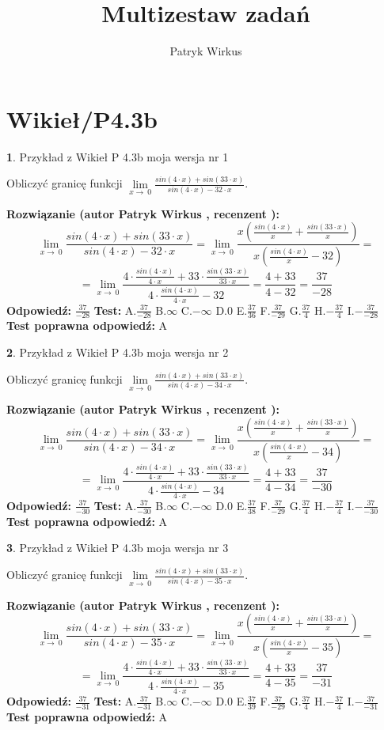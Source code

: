 \documentclass[12pt, a4paper]{article}
\title{Multizestaw zadań}
\author{Patryk Wirkus}
\date{}
\theoremstyle{definition} %
\newtheorem{zad}{}
\newcommand{\kategoria}[1]{\section{#1}}
\newcommand{\zadStart}[1]{\begin{zad}#1\newline}
\newcommand{\zadStop}{\end{zad}}
\newcommand{\rozwStart}[2]{\noindent \textbf{Rozwiązanie (autor #1 , recenzent #2): }\newline}
\newcommand{\rozwStop}{\newline}
\newcommand{\odpStart}{\noindent \textbf{Odpowiedź:}\newline}
\newcommand{\odpStop}{\newline}
\newcommand{\testStart}{\noindent \textbf{Test:}\newline}
\newcommand{\testStop}{\newline}
\newcommand{\kluczStart}{\noindent \textbf{Test poprawna odpowiedź:}\newline}
\newcommand{\kluczStop}{\newline}
\begin{document}
\maketitle

\kategoria{Wikieł/P4.3b}


\zadStart{Przykład z Wikieł P 4.3b moja wersja nr 1}


Obliczyć granicę funkcji $\lim\limits_{x\to\ 0}\frac{sin(4 \cdot x)+sin(33 \cdot x)}{sin(4 \cdot x)-32 \cdot x}$.
\zadStop
\rozwStart{Patryk Wirkus}{}
$$\lim\limits_{x\to\ 0}\frac{sin(4 \cdot x)+sin(33 \cdot x)}{sin(4 \cdot x)-32 \cdot x}=\lim\limits_{x\to\ 0}\frac{x(\frac{sin(4 \cdot x)}{x}+\frac{sin(33 \cdot x)}{x})}{x(\frac{sin(4 \cdot x)}{x}-32)}=$$
$$=\lim\limits_{x\to\ 0}\frac{4 \cdot \frac{sin(4 \cdot x)}{4 \cdot x}+33 \cdot \frac{sin(33 \cdot x)}{33 \cdot x}}{4 \cdot \frac{sin(4 \cdot x)}{4 \cdot x}-32}=\frac{4+33}{4-32} = \frac{37}{-28}$$
\rozwStop
\odpStart
$\frac{37}{-28}$
\odpStop
\testStart
A.$\frac{37}{-28}$
B.$\infty$
C.$-\infty$
D.$0$
E.$\frac{37}{36}$
F.$\frac{37}{-29}$
G.$\frac{37}{4}$
H.$-\frac{37}{4}$
I.$-\frac{37}{-28}$
\testStop
\kluczStart
A
\kluczStop



\zadStart{Przykład z Wikieł P 4.3b moja wersja nr 2}


Obliczyć granicę funkcji $\lim\limits_{x\to\ 0}\frac{sin(4 \cdot x)+sin(33 \cdot x)}{sin(4 \cdot x)-34 \cdot x}$.
\zadStop
\rozwStart{Patryk Wirkus}{}
$$\lim\limits_{x\to\ 0}\frac{sin(4 \cdot x)+sin(33 \cdot x)}{sin(4 \cdot x)-34 \cdot x}=\lim\limits_{x\to\ 0}\frac{x(\frac{sin(4 \cdot x)}{x}+\frac{sin(33 \cdot x)}{x})}{x(\frac{sin(4 \cdot x)}{x}-34)}=$$
$$=\lim\limits_{x\to\ 0}\frac{4 \cdot \frac{sin(4 \cdot x)}{4 \cdot x}+33 \cdot \frac{sin(33 \cdot x)}{33 \cdot x}}{4 \cdot \frac{sin(4 \cdot x)}{4 \cdot x}-34}=\frac{4+33}{4-34} = \frac{37}{-30}$$
\rozwStop
\odpStart
$\frac{37}{-30}$
\odpStop
\testStart
A.$\frac{37}{-30}$
B.$\infty$
C.$-\infty$
D.$0$
E.$\frac{37}{38}$
F.$\frac{37}{-29}$
G.$\frac{37}{4}$
H.$-\frac{37}{4}$
I.$-\frac{37}{-30}$
\testStop
\kluczStart
A
\kluczStop



\zadStart{Przykład z Wikieł P 4.3b moja wersja nr 3}


Obliczyć granicę funkcji $\lim\limits_{x\to\ 0}\frac{sin(4 \cdot x)+sin(33 \cdot x)}{sin(4 \cdot x)-35 \cdot x}$.
\zadStop
\rozwStart{Patryk Wirkus}{}
$$\lim\limits_{x\to\ 0}\frac{sin(4 \cdot x)+sin(33 \cdot x)}{sin(4 \cdot x)-35 \cdot x}=\lim\limits_{x\to\ 0}\frac{x(\frac{sin(4 \cdot x)}{x}+\frac{sin(33 \cdot x)}{x})}{x(\frac{sin(4 \cdot x)}{x}-35)}=$$
$$=\lim\limits_{x\to\ 0}\frac{4 \cdot \frac{sin(4 \cdot x)}{4 \cdot x}+33 \cdot \frac{sin(33 \cdot x)}{33 \cdot x}}{4 \cdot \frac{sin(4 \cdot x)}{4 \cdot x}-35}=\frac{4+33}{4-35} = \frac{37}{-31}$$
\rozwStop
\odpStart
$\frac{37}{-31}$
\odpStop
\testStart
A.$\frac{37}{-31}$
B.$\infty$
C.$-\infty$
D.$0$
E.$\frac{37}{39}$
F.$\frac{37}{-29}$
G.$\frac{37}{4}$
H.$-\frac{37}{4}$
I.$-\frac{37}{-31}$
\testStop
\kluczStart
A
\kluczStop
\end{document}

